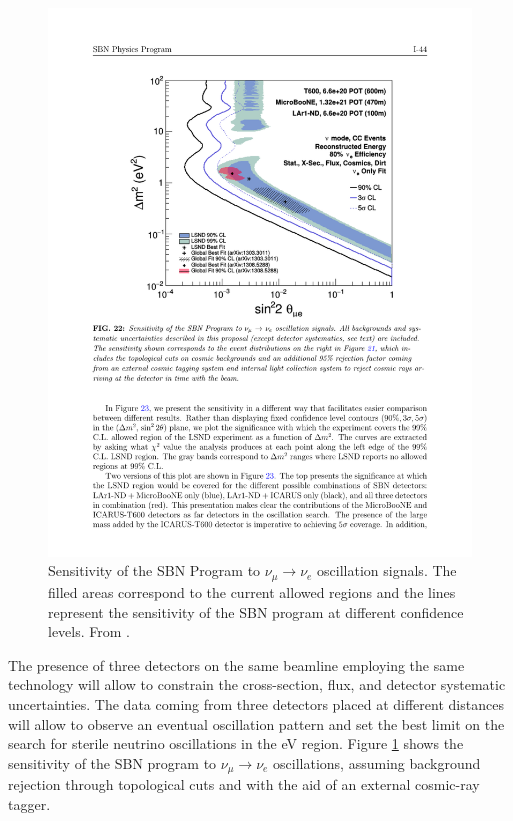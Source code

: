 \begin{figure}[htbp]
    \centering
    \includegraphics[width=0.75\linewidth]{figures/sbn_sensitivity.pdf}
    \caption{Sensitivity of the SBN Program to $\nu_{\mu}\rightarrow\nu_e$ oscillation signals. The filled areas correspond to the current allowed regions and the lines represent the sensitivity of the SBN program at different confidence levels. From \cite{Antonello:2015lea}.}
    \label{fig:sbn_sensitivity}
\end{figure}

The presence of three detectors on the same beamline employing the same technology will allow to constrain the cross-section, flux, and detector systematic uncertainties. The data coming from three detectors placed at different distances will allow to observe an eventual oscillation pattern and set the best limit on the search for sterile neutrino oscillations in the eV region. Figure \ref{fig:sbn_sensitivity} shows the sensitivity of the SBN program to $\nu_{\mu}\rightarrow\nu_e$ oscillations, assuming background rejection through topological cuts and with the aid of an external cosmic-ray tagger. 

